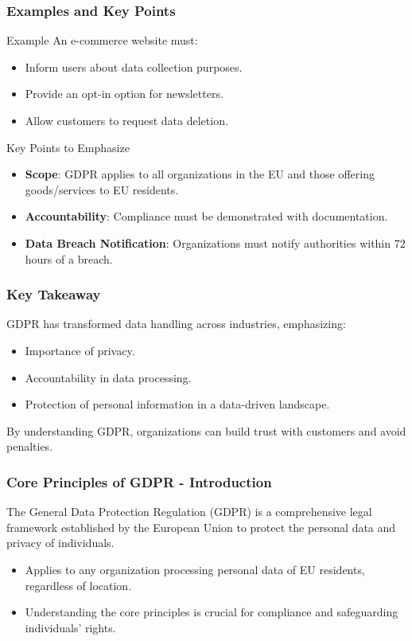 \documentclass[aspectratio=169]{beamer}
\begin{document}
\begin{frame}[fragile]
    \frametitle{Examples and Key Points}
    \begin{block}{Example}
        An e-commerce website must:
        \begin{itemize}
            \item Inform users about data collection purposes.
            \item Provide an opt-in option for newsletters.
            \item Allow customers to request data deletion.
        \end{itemize}
    \end{block}

    \begin{block}{Key Points to Emphasize}
        \begin{itemize}
            \item \textbf{Scope}: GDPR applies to all organizations in the EU and those offering goods/services to EU residents.
            \item \textbf{Accountability}: Compliance must be demonstrated with documentation.
            \item \textbf{Data Breach Notification}: Organizations must notify authorities within 72 hours of a breach.
        \end{itemize}
    \end{block}
\end{frame}

\begin{frame}[fragile]
    \frametitle{Key Takeaway}
    GDPR has transformed data handling across industries, emphasizing:
    \begin{itemize}
        \item Importance of privacy.
        \item Accountability in data processing.
        \item Protection of personal information in a data-driven landscape.
    \end{itemize}
    
    \pause %
    By understanding GDPR, organizations can build trust with customers and avoid penalties.
\end{frame}

\begin{frame}[fragile]
    \frametitle{Core Principles of GDPR - Introduction}
    The General Data Protection Regulation (GDPR) is a comprehensive legal framework established by the European Union to protect the personal data and privacy of individuals.
    
    \begin{itemize}
        \item Applies to any organization processing personal data of EU residents, regardless of location.
        \item Understanding the core principles is crucial for compliance and safeguarding individuals' rights.
    \end{itemize}
\end{frame}
\end{document}
